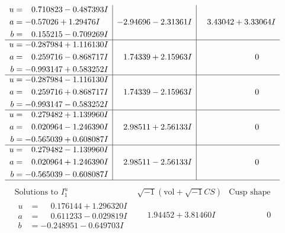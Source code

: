 \documentclass[1p]{elsarticle_modified}
\theoremstyle{definition}
\newcommand{\I}{\sqrt{-1}}
\begin{document}
$$\begin{array}{c|c|c}
\begin{aligned}
u &= \phantom{-}0.710823 - 0.487393 I \\
a &= -0.57026 + 1.29476 I \\
b &= \phantom{-}0.155215 - 0.709269 I\end{aligned}
 & -2.94696 - 2.31361 I & \phantom{-}3.43042 + 3.33064 I \\ \hline\begin{aligned}
u &= -0.287984 + 1.116130 I \\
a &= \phantom{-}0.259716 - 0.868717 I \\
b &= -0.993147 + 0.583252 I\end{aligned}
 & \phantom{-}1.74339 + 2.15963 I & \phantom{-0.000000 } 0 \\ \hline\begin{aligned}
u &= -0.287984 - 1.116130 I \\
a &= \phantom{-}0.259716 + 0.868717 I \\
b &= -0.993147 - 0.583252 I\end{aligned}
 & \phantom{-}1.74339 - 2.15963 I & \phantom{-0.000000 } 0 \\ \hline\begin{aligned}
u &= \phantom{-}0.279482 + 1.139960 I \\
a &= \phantom{-}0.020964 - 1.246390 I \\
b &= -0.565039 + 0.608087 I\end{aligned}
 & \phantom{-}2.98511 + 2.56133 I & \phantom{-0.000000 } 0 \\ \hline\begin{aligned}
u &= \phantom{-}0.279482 - 1.139960 I \\
a &= \phantom{-}0.020964 + 1.246390 I \\
b &= -0.565039 - 0.608087 I\end{aligned}
 & \phantom{-}2.98511 - 2.56133 I & \phantom{-0.000000 } 0\\
 \hline 
 \end{array}$$\newpage$$\begin{array}{c|c|c}  
\text{Solutions to }I^u_{1}& \I (\text{vol} + \sqrt{-1}CS) & \text{Cusp shape}\\
 \hline 
\begin{aligned}
u &= \phantom{-}0.176144 + 1.296320 I \\
a &= \phantom{-}0.611233 - 0.029819 I \\
b &= -0.248951 - 0.649703 I\end{aligned}
 & \phantom{-}1.94452 + 3.81460 I & \phantom{-0.000000 } 0 \\ \hline\begin{aligned}

\end{aligned}
\end{array}$$
\end{document}
